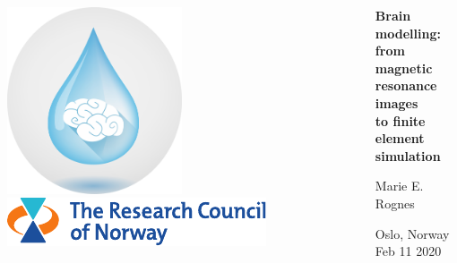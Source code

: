 \documentclass[mathserif, aspectratio=169]{beamer}
\begin{document}
\begin{frame}
\begin{columns}
\begin{column}{0.25\textwidth}
    \vspace{1em}
    \includegraphics[width=0.5\textwidth]{graphics/waterscape_logo.png} \\
    \vspace{1em}
    \includegraphics[width=\textwidth]{graphics/rcn-logo.pdf} \\
    \end{column}
    \begin{column}{0.75\textwidth}
    {
    \centering

      \vspace{4em}

      {\bf Brain modelling: \\ from magnetic resonance images \\ to finite element simulation} \\

      \bigskip
      \bigskip
      
      Marie E. Rognes \\
      \bigskip
      \bigskip

      Oslo, Norway \\
      \medskip
      Feb 11 2020 \\
      }
    \end{column}
  \end{columns}
\end{frame}

\cleanpage


\end{document}
